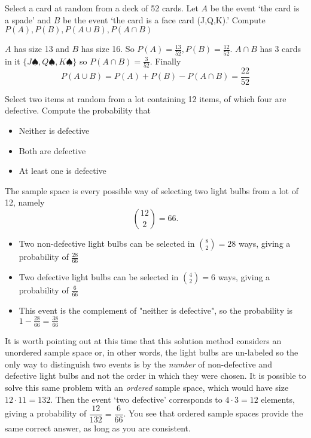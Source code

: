 \documentclass[../main.tex]{subfiles}
\begin{document}
\begin{example}
	Select a card at random from a deck of 52 cards. Let $A$
	be the event `the card is a spade' and $B$ be the event
	`the card is a face card (J,Q,K).' Compute $P(A), P(B),
	P(A \cup B), P(A \cap B)$
\end{example}

\begin{solution}
	$A$ has size 13 and $B$ has size 16. So $P(A) = \frac{13}{52},
	P(B) = \frac{12}{52}$. $A \cap B$ has 3 cards in it $\{
	J\spadesuit, Q\spadesuit, K\spadesuit\}$ so
	$P(A \cap B) = \frac{3}{52}$. Finally
	$$P(A \cup B) = P(A) + P(B) - P(A\cap B) = \frac{22}{52}$$
\end{solution}

\begin{example}
	Select two items at random from a lot containing 12 items, of which four are defective. Compute the probability that
	\begin{itemize}
		\item Neither is defective
		\item Both are defective
		\item At least one is defective
	\end{itemize}
\end{example}

\begin{solution}
	The sample space is every possible way of selecting two light bulbs from a lot of 12, namely $${12 \choose 2} = 66.$$
	\begin{itemize}
		\item Two non-defective light bulbs can be selected
		in ${8 \choose 2} = 28$ ways, giving a probability
		of $\frac{28}{66}$
		\item Two defective light bulbs can be selected in ${4
		\choose 2} = 6$ ways, giving a probability of $\frac{6}{66}$
		\item This event is the complement of "neither is defective",
		so the probability is $1-\frac{28}{66} = \frac{38}{66}$
	\end{itemize}

	It is worth pointing out at this time that this solution
	method considers an unordered sample space or, in other words,
	the light bulbs are un-labeled so the only way to distinguish
	two events is by the \textit{number} of non-defective and
	defective light bulbs and not the order in which they were
	chosen. It is possible to solve this same problem with an
	\textit{ordered} sample space, which would have size $12\cdot11 = 132$. Then the event `two defective' corresponds
	to $4 \cdot 3 = 12$ elements, giving a probability
	of $\dfrac{12}{132} = \dfrac{6}{66}$. You see that
	ordered sample spaces provide the same correct answer, as long
	as you are consistent.
\end{solution}
\end{document}
